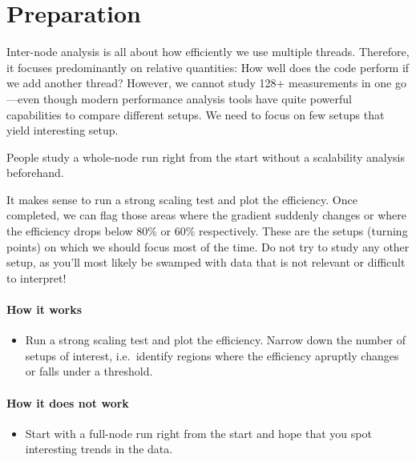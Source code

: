 \section{Preparation}
\label{section:node-level:preparation}


Inter-node analysis is all about how efficiently we use multiple threads.
Therefore, it focuses predominantly on relative quantities:
How well does the code perform if we add another thread?
However, we cannot study 128+ measurements in one go---even though modern performance analysis tools have quite powerful capabilities to compare different setups.
We need to focus on few setups that yield interesting setup.



\begin{assessmentcrime}
 People study a whole-node run right from the start without a scalability
 analysis beforehand.
\end{assessmentcrime}



\noindent
It makes sense to run a strong scaling test and plot the efficiency. 
Once completed, we can flag those areas where the gradient suddenly changes or   
where the efficiency drops below 80\% or 60\% respectively.
These are the setups (turning points) on which we should focus most of the time.
Do not try to study any other setup, as you'll most likely be swamped with data
that is not relevant or difficult to interpret!


\paragraph*{How it works}

\begin{itemize}[noitemsep]
  \item[$\boxplus$] Run a strong scaling test and plot the efficiency. Narrow down the number of setups of interest, i.e.~identify regions where the efficiency apruptly changes or falls under a threshold.
\end{itemize}


\paragraph*{How it does not work}

\begin{itemize}[noitemsep]
  \item[$\boxminus$] Start with a full-node run right from the start and hope that you spot interesting trends in the data.
\end{itemize}
